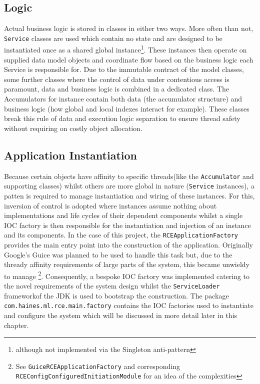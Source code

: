 \documentclass[a4paper,11pt]{scrreprt}
\begin{document}
\subsection{Logic}
Actual business logic is stored in classes in either two ways. More often than not, \verb|Service| classes are used which contain no state and are designed to be instantiated once as a shared global instance\footnote{although not implemented via the Singleton anti-pattern}. These instances then operate on supplied data model objects and coordinate flow based on the business logic each Service is responsible for. Due to the immutable contract of the model classes, some further classes where the control of data under contentious access is paramount, data and business logic is combined in a dedicated class. The Accumulators for instance contain both data (the accumulator structure) and business logic (how global and local indexes interact for example). These classes break this rule of data and execution logic separation to ensure thread safety without requiring on costly object allocation. 
\subsection{Application Instantiation}
Because certain objects have affinity to specific threads(like the \verb|Accumulator| and supporting classes) whilst others are more global in nature (\verb|Service| instances), a patten is required to manage instantiation and wiring of these instances. For this, inversion of control\cite{ioc} is adopted where instances assume nothing about implementations and life cycles of their dependent components whilst a single IOC factory is then responsible for the instantiation and injection of an instance and its components. In the case of this project, the \verb|RCEApplicationFactory| provides the main entry point into the construction of the application. Originally Google's Guice\cite{guice} was planned to be used to handle this task but, due to the thready affinity requirements of large parts of the system, this became unwieldy to manage \footnote{See \verb|GuiceRCEApplicationFactory| and corresponding \verb|RCEConfigConfiguredInitiationModule| for an idea of the complexities}. Consequently, a bespoke IOC factory was implemented catering to the novel requirements of the system design whilst the \verb|ServiceLoader| frameworkof the JDK is used to bootstrap the construction. The package \verb|com.haines.ml.rce.main.factory| contains the IOC factories used to instantiate and configure the system which will be discussed in more detail later in this chapter.
\end{document}
